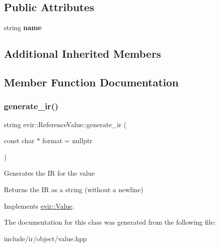 \subsection*{Public Attributes}
\begin{DoxyCompactItemize}
\item 
\mbox{\label{classevir_1_1ReferenceValue_ab1ee319a03944d8622ea3b06394cef1d}} 
string {\bfseries name}
\end{DoxyCompactItemize}
\subsection*{Additional Inherited Members}


\subsection{Member Function Documentation}
\mbox{\label{classevir_1_1ReferenceValue_ad669613befab66578629de2ccfb8c2c3}} 
\subsubsection{\texorpdfstring{generate\+\_\+ir()}{generate\_ir()}}
{\footnotesize\ttfamily string evir\+::\+Reference\+Value\+::generate\+\_\+ir (\begin{DoxyParamCaption}\item[{const char $\ast$}]{format = {\ttfamily nullptr} }\end{DoxyParamCaption})\hspace{0.3cm}{\ttfamily [virtual]}}

Generates the IR for the value \begin{DoxyReturn}{Returns}
the IR as a string (without a newline) 
\end{DoxyReturn}


Implements \hyperlink{classevir_1_1Value_a3e7e5bc634fd5bba528324076fe2a763}{evir\+::\+Value}.



The documentation for this class was generated from the following file\+:\begin{DoxyCompactItemize}
\item 
include/ir/object/value.\+hpp\end{DoxyCompactItemize}
